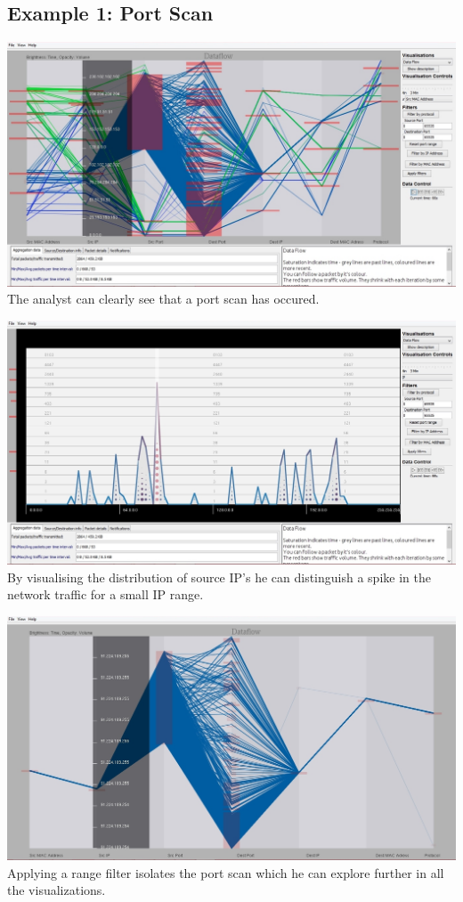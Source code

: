 \subsection{Example 1: Port Scan}

\includegraphics[width=\linewidth]{materials/portscan_detected.jpg}
The analyst can clearly see that a port scan has occured.

\includegraphics[width=\linewidth]{materials/portscan_identify.jpg}
By visualising the distribution of source IP's he can distinguish a spike in the network traffic for a small IP range.

\includegraphics[width=\linewidth]{materials/portscan_explore.jpg}
Applying a range filter isolates the port scan which he can explore further in all the visualizations.

